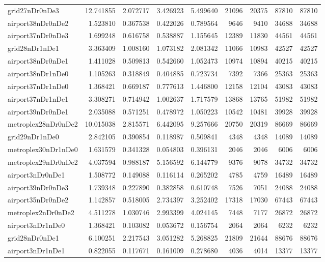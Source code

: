 \begin{longtable}{|l|r|r|r|r|r|r|r|r|}
grid27nDr0nDe3 & 12.741855 & 2.072717 & 3.426923 & 5.499640 & 21096 & 20375 & 87810 & 87810 \\
airport38nDr0nDe2 & 1.523810 & 0.367538 & 0.422026 & 0.789564 & 9646 & 9410 & 34688 & 34688 \\
airport37nDr0nDe3 & 1.699248 & 0.616758 & 0.538887 & 1.155645 & 12389 & 11830 & 44561 & 44561 \\
grid28nDr1nDe1 & 3.363409 & 1.008160 & 1.073182 & 2.081342 & 11066 & 10983 & 42527 & 42527 \\
airport38nDr0nDe1 & 1.411028 & 0.509813 & 0.542660 & 1.052473 & 10974 & 10894 & 40215 & 40215 \\
airport38nDr1nDe0 & 1.105263 & 0.318849 & 0.404885 & 0.723734 & 7392 & 7366 & 25363 & 25363 \\
airport37nDr1nDe0 & 1.368421 & 0.669187 & 0.777613 & 1.446800 & 12158 & 12104 & 43083 & 43083 \\
airport37nDr1nDe1 & 3.308271 & 0.714942 & 1.002637 & 1.717579 & 13868 & 13765 & 51982 & 51982 \\
airport39nDr0nDe1 & 2.035088 & 0.571251 & 0.478972 & 1.050223 & 10542 & 10481 & 39928 & 39928 \\
metroplex28nDr0nDe2 & 10.015038 & 2.815571 & 6.442095 & 9.257666 & 20750 & 20319 & 86669 & 86669 \\
grid29nDr1nDe0 & 2.842105 & 0.390854 & 0.118987 & 0.509841 & 4348 & 4348 & 14089 & 14089 \\
metroplex30nDr1nDe0 & 1.631579 & 0.341328 & 0.054803 & 0.396131 & 2046 & 2046 & 6006 & 6006 \\
metroplex29nDr0nDe2 & 4.037594 & 0.988187 & 5.156592 & 6.144779 & 9376 & 9078 & 34732 & 34732 \\
airport3nDr0nDe1 & 1.508772 & 0.149088 & 0.116114 & 0.265202 & 4785 & 4759 & 16489 & 16489 \\
airport39nDr0nDe3 & 1.739348 & 0.227890 & 0.382858 & 0.610748 & 7526 & 7051 & 24088 & 24088 \\
airport35nDr0nDe2 & 1.142857 & 0.518005 & 2.734397 & 3.252402 & 17318 & 17030 & 67443 & 67443 \\
metroplex2nDr0nDe2 & 4.511278 & 1.030746 & 2.993399 & 4.024145 & 7448 & 7177 & 26872 & 26872 \\
airport3nDr1nDe0 & 1.368421 & 0.103082 & 0.053672 & 0.156754 & 2064 & 2064 & 6232 & 6232 \\
grid28nDr0nDe1 & 6.100251 & 2.217543 & 3.051282 & 5.268825 & 21809 & 21644 & 88676 & 88676 \\
airport3nDr1nDe1 & 0.822055 & 0.117671 & 0.161009 & 0.278680 & 4036 & 4014 & 13377 & 13377 \\

\end{longtable}
